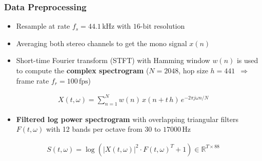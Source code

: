 \documentclass{beamer}
\begin{document}
\begin{frame}
\frametitle{Data Preprocessing}
\begin{itemize}
\item Resample at rate $f_s = 44.1 \,\text{kHz}$ with $16\text{-bit}$ resolution
\item Averaging both stereo channels to get the mono signal $x(n)$ 
\item Short-time Fourier transform (STFT) with Hamming window $w(n)$ is used to compute the \textbf{complex spectrogram} ($N = 2048$, hop size $h=441$ $\,\Rightarrow\,$ frame rate $f_r = 100 \,\text{fps}$)
\end{itemize}
\vspace{-0.5em}
\begin{align}
X(t,\omega) = \sum_{n = 1}^{N} w(n) \, x(n + t\,h) \, e^{-2 \pi j \omega n /N}
\end{align} 
\vspace{-0.5em}
\begin{itemize}
\item \textbf{Filtered log power spectrogram} with overlapping triangular filters $F(t,\omega)$ with 12 bands per octave from $30$ to $\num[group-separator={,}]{17000} \, \text{Hz}$
\end{itemize}
\vspace{-0.5em}
\begin{align}
S(t,\omega) = \log \left( |X(t,\omega)|^2 \cdot F(t,\omega)^T + 1 \right) \in \mathbb R^{T\times88}  
\end{align} 
\end{frame}
\end{document}
